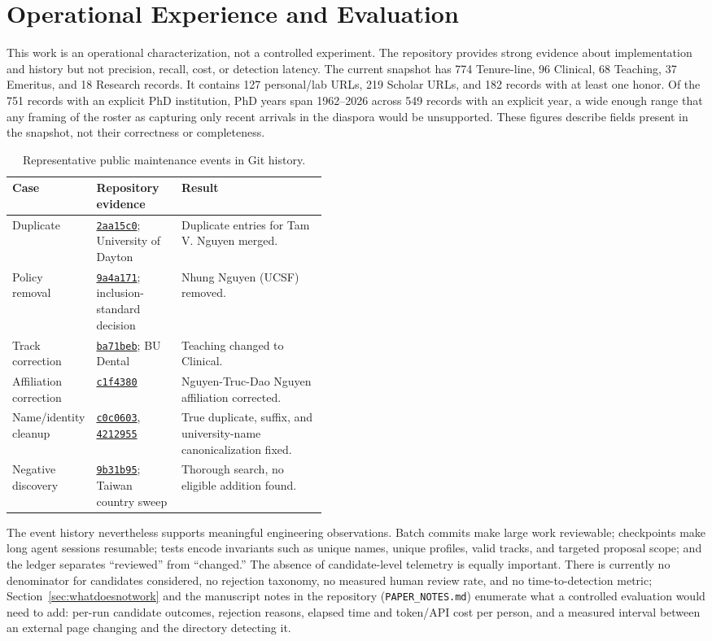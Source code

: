 \documentclass[11pt]{article}
\newcommand{\code}[1]{\texttt{\small #1}}
\newcommand{\ghrepo}{https://github.com/dynaroars/vietprofs}
\newcommand{\commitlink}[1]{\href{\ghrepo/commit/#1}{\code{#1}}}
\begin{document}
\section{Operational Experience and Evaluation}
This work is an operational characterization, not a controlled experiment.
The repository provides strong evidence about implementation and history but not precision, recall, cost, or detection latency.
The current snapshot has 774 Tenure-line, 96 Clinical, 68 Teaching, 37 Emeritus, and 18 Research records.
It contains 127 personal/lab URLs, 219 Scholar URLs, and 182 records with at least one honor.
Of the 751 records with an explicit PhD institution, PhD years span 1962--2026 across 549 records with an explicit year, a wide enough range that any framing of the roster as capturing only recent arrivals in the diaspora would be unsupported.
These figures describe fields present in the snapshot, not their correctness or completeness.

\begin{table}[t]
\centering
\caption{Representative public maintenance events in Git history.}
\label{tab:cases}
\small
\begin{tabularx}{\linewidth}{@{}p{0.18\linewidth}p{0.27\linewidth}X@{}}
\toprule
Case & Repository evidence & Result\\
\midrule
Duplicate & \commitlink{2aa15c0}; University of Dayton & Duplicate entries for Tam V. Nguyen merged.\\
Policy removal & \commitlink{9a4a171}; inclusion-standard decision & Nhung Nguyen (UCSF) removed.\\
Track correction & \commitlink{ba71beb}; BU Dental & Teaching changed to Clinical.\\
Affiliation correction & \commitlink{c1f4380} & Nguyen-Truc-Dao Nguyen affiliation corrected.\\
Name/identity cleanup & \commitlink{c0c0603}, \commitlink{4212955} & True duplicate, suffix, and university-name canonicalization fixed.\\
Negative discovery & \commitlink{9b31b95}; Taiwan country sweep & Thorough search, no eligible addition found.\\
\bottomrule
\end{tabularx}
\end{table}

The event history nevertheless supports meaningful engineering observations.
Batch commits make large work reviewable; checkpoints make long agent sessions resumable; tests encode invariants such as unique names, unique profiles, valid tracks, and targeted proposal scope; and the ledger separates ``reviewed'' from ``changed.''
The absence of candidate-level telemetry is equally important.
There is currently no denominator for candidates considered, no rejection taxonomy, no measured human review rate, and no time-to-detection metric; Section~\ref{sec:whatdoesnotwork} and the manuscript notes in the repository (\code{PAPER\_NOTES.md}) enumerate what a controlled evaluation would need to add: per-run candidate outcomes, rejection reasons, elapsed time and token/API cost per person, and a measured interval between an external page changing and the directory detecting it.
\end{document}
